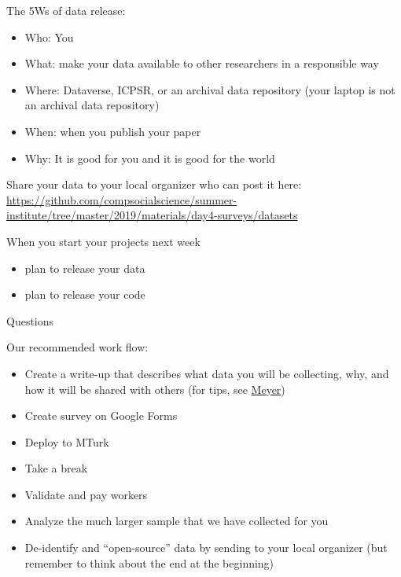 \documentclass[aspectratio=169]{beamer}
\begin{document}
\begin{frame}

The 5Ws of data release: \pause
\begin{itemize}
\item Who: You
\pause
\item What: make your data available to other researchers in a responsible way
\pause
\item Where: Dataverse, ICPSR, or an archival data repository \pause (your laptop is not an archival data repository)
\pause 
\item When:  when you publish your paper
\pause
\item Why: It is good for you and it is good for the world
\end{itemize}

\end{frame}
\begin{frame}

Share your data to your local organizer who can post it here:\\
\url{https://github.com/compsocialscience/summer-institute/tree/master/2019/materials/day4-surveys/datasets}

\end{frame}
\begin{frame}

When you start your projects next week
\begin{itemize}
\item plan to release your data
\item plan to release your code
\end{itemize}

\end{frame}
\begin{frame}

\begin{center}
\LARGE Questions
\end{center}

\end{frame}
\begin{frame}

Our recommended work flow:
\begin{itemize}
\item Create a write-up that describes what data you will be collecting, why, and how it will be shared with others (for tips, see \href{https://doi.org/10.1177/2515245917747656}{Meyer})
\item Create survey on Google Forms
\item Deploy to MTurk
\item Take a break
\item Validate and pay workers
\item Analyze the much larger sample that we have collected for you
\item De-identify and ``open-source'' data by sending to your local organizer (but remember to think about the end at the beginning)
\end{itemize}

\end{frame}
\end{document}
